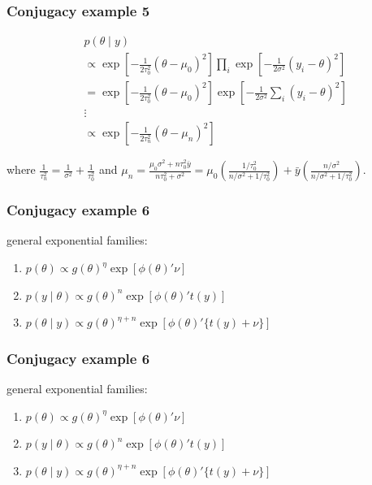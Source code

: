\documentclass{beamer}
\begin{document}

\begin{frame}[fragile]
\frametitle{Conjugacy example 5}

\begin{align*}
&p(\theta \mid y) \\
&\propto \exp\left[-\frac{1}{2 \tau_0^2}(\theta - \mu_0)^2 \right] \prod_i \exp\left[-\frac{1}{2 \sigma^2} \left(y_i - \theta \right)^2 \right] \\
&= \exp\left[-\frac{1}{2 \tau_0^2}(\theta - \mu_0)^2 \right] \exp\left[-\frac{1}{2 \sigma^2} \sum_i \left(y_i - \theta \right)^2 \right] \\
&\vdots \tag{homework} \\
&\propto \exp\left[ - \frac{1}{2 \tau_n^2} (\theta - \mu_n)^2 \right]
\end{align*}

where $\frac{1}{\tau_n^2} = \frac{1}{\sigma^2} + \frac{1}{\tau_0^2}$ and $\mu_n = \frac{ \mu_0 \sigma^2 + n \tau_0^2 \bar{y}}{n \tau_0^2 + \sigma^2} = \mu_0 \left( \frac{ 1/\tau_0^2 }{n / \sigma^2 + 1/ \tau_0^2}\right) + \bar{y} \left(\frac{ n /\sigma^2}{n /\sigma^2 + 1/\tau_0^2}\right)$. 

\end{frame}




\begin{frame}[fragile]
\frametitle{Conjugacy example 6}

general exponential families:
\begin{enumerate}
\item $p(\theta) \propto g(\theta)^{\eta} \exp\left[\phi(\theta)' \nu \right]$
\item $p(y \mid \theta) \propto g(\theta)^{n} \exp\left[\phi(\theta)' t(y) \right] $
\item $p(\theta \mid y) \propto g(\theta)^{\eta + n} \exp\left[\phi(\theta)' \{t(y) + \nu\} \right] $
\end{enumerate}


\end{frame}


\begin{frame}[fragile]
\frametitle{Conjugacy example 6}

general exponential families:
\begin{enumerate}
\item $p(\theta) \propto g(\theta)^{\eta} \exp\left[\phi(\theta)' \nu \right]$
\item $p(y \mid \theta) \propto g(\theta)^{n} \exp\left[\phi(\theta)' t(y) \right] $
\item $p(\theta \mid y) \propto g(\theta)^{\eta + n} \exp\left[\phi(\theta)' \{t(y) + \nu\} \right] $
\end{enumerate}


\end{frame}
\end{document}
